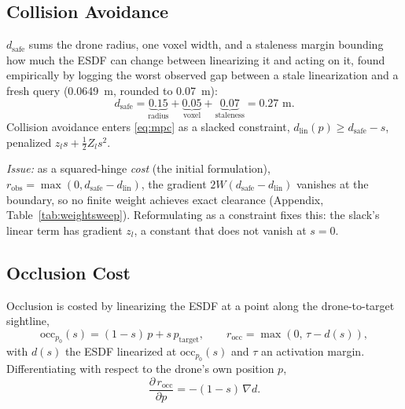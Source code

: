 \documentclass[conference]{IEEEtran}
\begin{document}
\subsection{Collision Avoidance}
\label{sec:cost-collision}

$d_{\text{safe}}$ sums the drone radius, one voxel width, and a staleness margin bounding how much the ESDF can change between linearizing it and acting on it, found empirically by logging the worst observed gap between a stale linearization and a fresh query (0.0649~m, rounded to 0.07~m):
\begin{equation}
d_{\text{safe}} = \underbrace{0.15}_{\text{radius}} + \underbrace{0.05}_{\text{voxel}} + \underbrace{0.07}_{\text{staleness}} = 0.27 \text{ m.}
\end{equation}
Collision avoidance enters \eqref{eq:mpc} as a slacked constraint, $d_{\text{lin}}(p) \ge d_{\text{safe}} - s$, penalized $z_l s + \tfrac12 Z_l s^2$.

\emph{Issue:} as a squared-hinge \emph{cost} (the initial formulation), $r_{\text{obs}}=\max(0,d_{\text{safe}}-d_{\text{lin}})$, the gradient $2W(d_{\text{safe}}-d_{\text{lin}})$ vanishes at the boundary, so no finite weight achieves exact clearance (Appendix, Table~\ref{tab:weightsweep}). Reformulating as a constraint fixes this: the slack's linear term has gradient $z_l$, a constant that does not vanish at $s=0$.

\subsection{Occlusion Cost}
\label{sec:cost-occ}

Occlusion is costed by linearizing the ESDF at a point along the drone-to-target sightline,
\begin{equation}
\text{occ}_{p_0}(s) = (1-s)\, p + s\, p_{\text{target}}, \qquad r_{\text{occ}} = \max(0,\, \tau - d(s)),
\label{eq:occpoint}
\end{equation}
with $d(s)$ the ESDF linearized at $\text{occ}_{p_0}(s)$ and $\tau$ an activation margin. Differentiating with respect to the drone's own position $p$,
\begin{equation}
\frac{\partial\, r_{\text{occ}}}{\partial p} = -(1-s)\,\nabla d.
\label{eq:chainrule}
\end{equation}
\end{document}
